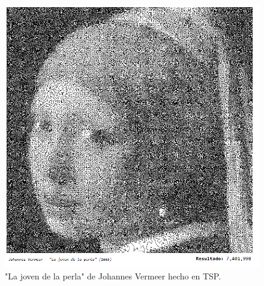     \begin{figure}[hbtp]
        \centering
            \includegraphics[width=1\textwidth]{PruebasResultados/Imagenes/TSP_ART/earring.png}
            \caption{"La joven de la perla" de Johannes Vermeer hecho en TSP.}
            \label{fig:earring.png}
    \end{figure}
      \clearpage \newpage